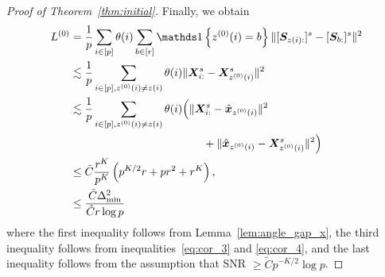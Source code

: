 \documentclass[journal]{IEEEtran}
\theoremstyle{definition}
\theoremstyle{definition}
\newcommand{\of}[1]{\left(#1\right)}
\newcommand{\offf}[1]{\left\{#1\right\}}
\begin{document}
\begin{proof}[Proof of Theorem~\ref{thm:initial}]
Finally, we obtain 
\begin{align}
     L^{(0)} &= \frac{1}{p}  \sum_{i \in [p]} \theta(i) \sum_{b \in [r]}  \ind \offf{ z^{(0)}(i) = b } \onormSize{}{ [ \mS_{  z(i):}  ]^s - [ \mS_{b:}  ]^s  }^2 \\
     & \lesssim \frac{1}{p}  \sum_{i \in [p], z^{(0)}(i) \neq z(i)} \theta(i)  \onormSize{}{ \mX_{i:}^s -  \mX_{z^{(0)}(i)}^s  }^2\\
     & \lesssim \frac{1}{p}  \sum_{i \in [p], z^{(0)}(i) \neq z(i)} \theta(i) \Big( \onormSize{}{\mX_{i:}^s - \hat \mx_{z^{(0)}(i)}}^2 \\
     &  \quad \quad \quad \quad \quad \quad \quad \quad \quad \quad\quad \quad + \onormSize{}{ \hat \mx_{z^{(0)}(i)} - \mX_{z^{(0)}(i)}^s  }^2 \Big) \\
     & \leq \bar C \frac{r^{K}}{p^{K}} \of{ p^{K/2}r + pr^2 + r^K}, \\
     & \leq \frac{\bar C\Delta_{\min}^2}{ \tilde C r \log p}
\end{align}
where the first inequality follows from Lemma~\ref{lem:angle_gap_x}, the third inequality follows from inequalities~\eqref{eq:cor_3} and \eqref{eq:cor_4}, and the last inequality follows from the assumption that SNR $\geq \tilde C p^{-K/2} \log p$.
\end{proof}
\end{document}
